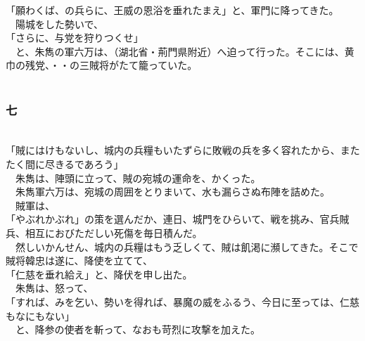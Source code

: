 \documentclass[
  paper=a5,
  fontsize=10pt,
  jafontsize=9.5pt,
  tate,                  %
  open_bracket_pos=nibu, %
]{jlreq}
\begin{document}
「願わくば、の兵らに、王威の恩浴を垂れたまえ」と、軍門に降ってきた。\\


　陽城をした勢いで、\\


「さらに、与党を狩りつくせ」\\


　と、朱雋の軍六万は、（湖北省・荊門県附近）へ迫って行った。そこには、黄巾の残党、・・の三賊将がたて籠っていた。\\

\\

\subsubsection{七}

\\


「賊にはけもないし、城内の兵糧もいたずらに敗戦の兵を多く容れたから、またたく間に尽きるであろう」\\


　朱雋は、陣頭に立って、賊の宛城の運命を、かくった。\\


　朱雋軍六万は、宛城の周囲をとりまいて、水も漏らさぬ布陣を詰めた。\\


　賊軍は、\\


「やぶれかぶれ」の策を選んだか、連日、城門をひらいて、戦を挑み、官兵賊兵、相互におびただしい死傷を毎日積んだ。\\


　然しいかんせん、城内の兵糧はもう乏しくて、賊は飢渇に瀕してきた。そこで賊将韓忠は遂に、降使を立てて、\\


「仁慈を垂れ給え」と、降伏を申し出た。\\


　朱雋は、怒って、\\


「すれば、みを乞い、勢いを得れば、暴魔の威をふるう、今日に至っては、仁慈もなにもない」\\


　と、降参の使者を斬って、なおも苛烈に攻撃を加えた。\\
\end{document}
